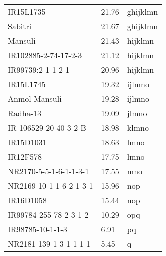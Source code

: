 \documentclass[]{article}
\begin{document}
\begin{longtable}{lll}
\rowcolor{gray!6}  IR15L1735 & 21.76 & ghijklmn\\
Sabitri & 21.67 & ghijklmn\\
\rowcolor{gray!6}  Mansuli & 21.43 & hijklmn\\
IR102885-2-74-17-2-3 & 21.12 & hijklmn\\
\addlinespace
\rowcolor{gray!6}  IR99739:2-1-1-2-1 & 20.96 & hijklmn\\
IR15L1745 & 19.32 & ijlmno\\
\rowcolor{gray!6}  Anmol Mansuli & 19.28 & ijlmno\\
Radha-13 & 19.09 & jlmno\\
\rowcolor{gray!6}  IR 106529-20-40-3-2-B & 18.98 & klmno\\
\addlinespace
IR15D1031 & 18.63 & lmno\\
\rowcolor{gray!6}  IR12F578 & 17.75 & lmno\\
NR2170-5-5-1-6-1-1-3-1 & 17.55 & mno\\
\rowcolor{gray!6}  NR2169-10-1-1-6-2-1-3-1 & 15.96 & nop\\
IR16D1058 & 15.44 & nop\\
\addlinespace
\rowcolor{gray!6}  IR99784-255-78-2-3-1-2 & 10.29 & opq\\
IR98785-10-1-1-3 & 6.91 & pq\\
\rowcolor{gray!6}  NR2181-139-1-3-1-1-1-1 & 5.45 & q\\
\bottomrule
\end{longtable}
\endgroup{}

\begingroup\fontsize{12}{14}\selectfont
\end{document}
